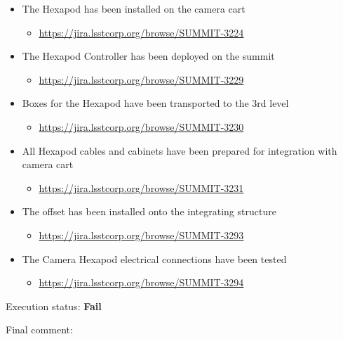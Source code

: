 \documentclass[SE,lsstdraft,STR,toc]{lsstdoc}
\providecommand{\tightlist}{
  \setlength{\itemsep}{0pt}\setlength{\parskip}{0pt}}
\begin{document}
\begin{itemize}
\tightlist
\item
  The Hexapod has been installed on the camera cart

  \begin{itemize}
  \tightlist
  \item
    \url{https://jira.lsstcorp.org/browse/SUMMIT-3224}
  \end{itemize}
\item
  The Hexapod Controller has been deployed on the summit

  \begin{itemize}
  \tightlist
  \item
    \url{https://jira.lsstcorp.org/browse/SUMMIT-3229}
  \end{itemize}
\item
  Boxes for the Hexapod have been transported to the 3rd level

  \begin{itemize}
  \tightlist
  \item
    \url{https://jira.lsstcorp.org/browse/SUMMIT-3230}
  \end{itemize}
\item
  All Hexapod cables and cabinets have been prepared for integration
  with camera cart

  \begin{itemize}
  \tightlist
  \item
    \url{https://jira.lsstcorp.org/browse/SUMMIT-3231}
  \end{itemize}
\item
  The offset has been installed onto the integrating structure

  \begin{itemize}
  \tightlist
  \item
    \url{https://jira.lsstcorp.org/browse/SUMMIT-3293}
  \end{itemize}
\item
  The Camera Hexapod electrical connections have been tested

  \begin{itemize}
  \tightlist
  \item
    \url{https://jira.lsstcorp.org/browse/SUMMIT-3294}
  \end{itemize}
\end{itemize}

Execution status: {\bf Fail }

Final comment:\\
\end{document}
